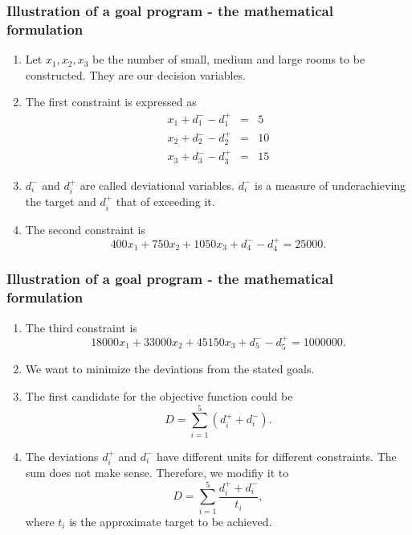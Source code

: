 \documentclass{beamer}
\begin{document}
\begin{frame}
\frametitle{Illustration of a goal program - the mathematical formulation}
\begin{enumerate}
\item Let $x_1, x_2, x_3$ be the number of small, medium and large rooms to be
constructed. They are our decision variables. 
\item The first constraint is expressed as
\begin{eqnarray}
x_1 + d_1^- - d_1^+ &=& 5 \label{e4} \\
x_2 + d_2^- - d_2^+ &=& 10 \label{e5} \\
x_3 + d_3^- - d_3^+ &=& 15 \label{e6}
\end{eqnarray}
\item $d_i^-$ and $d_i^+$ are called deviational variables. $d_i^-$ is a measure
of underachieving the target and $d_i^+$ that of exceeding it.
\item The second constraint is
\begin{equation}\label{e7}
400x_1 + 750 x_2 + 1050x_3 + d_4^- - d_4^+ = 25000.
\end{equation}
\end{enumerate}
\end{frame}

\begin{frame}
\frametitle{Illustration of a goal program - the mathematical formulation}
\begin{enumerate}
\item The third constraint is
\begin{equation}\label{e8}
18000x_1 + 33000 x_2 + 45150x_3 + d_5^- - d_5^+ = 1000000.
\end{equation}
\item We want to minimize the deviations from the stated goals.
\item The first candidate for the objective function could be
\begin{equation}\label{e9}
D = \sum_{i=1}^5 (d_i^+ + d_i^-).
\end{equation}
\item The deviations $d_i^+$ and $d_i^-$ have different units for different 
constraints. The sum does not make sense. Therefore, we modifiy it to
\begin{equation}\label{e10}
D = \sum_{i=1}^5 \frac{d_i^+ + d_i^-}{t_i},
\end{equation}
where $t_i$ is the approximate target to be achieved.
\end{enumerate}
\end{frame}
\end{document}
